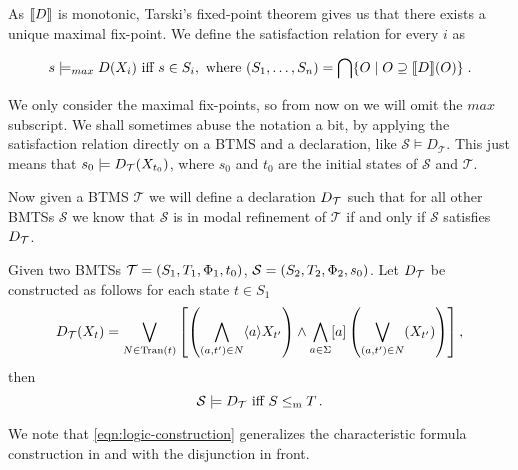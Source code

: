 As $\llbracket D \rrbracket$ is monotonic, Tarski's fixed-point theorem gives us that there exists a unique maximal fix-point. 
We define the satisfaction relation for every $i$ as

\[
	s \models_{max} D(X_i) \text{ iff } s \in S_i, \text{ where } (S_1,\ldots,S_n) = \bigcap \{O \mid O \supseteq \llbracket D \rrbracket(O)\}\;.
\]

We only consider the maximal fix-points, so from now on we will omit the $max$ subscript. We shall sometimes abuse the notation a bit, by applying the satisfaction relation directly on a BTMS and a declaration, like $ \mathcal S \models D_\mathcal T$. This just means that $s_0 \models D_\mathcal{T}(X_{t_0})$, where $s_0$ and $t_0$ are the initial states of $\mathcal S$ and $\mathcal T$.

Now given a BTMS $\mathcal{T}$ we will define a declaration $D_\mathcal{T}$ such that for all other BMTSs $\mathcal{S}$ we know that $\mathcal{S}$ is in modal refinement of $\mathcal{T}$ if and only if $\mathcal{S}$ satisfies $D_\mathcal{T}$.

\begin{theorem}\label{thm:charataristic}
	Given two BMTSs $\mathcal{T}=(S_1,T_1,\mathrm{\Phi}_1,t_0)$, $\mathcal{S} = (S_2,T_2,\mathrm{\Phi}_2,s_0)$. Let $D_\mathcal{T}$ be constructed as follows for each state $t \in S_1$ 
	\[\label{eqn:logic-construction}
		\DecT(X_t) = 	%
				 	\bigvee_{ N \in \val(t)}
					\left [ 
						\left ( 
							\bigwedge_{(a,t') \in N}\ldia{a}X_{t'}
						\right ) 
						\wedge 
						\bigwedge_{a \in \Sigma}\lbox{a}
							\left( 
								\bigvee_{(a,t') \in N}(X_{t'}) 
							\right)
					\right ],
	\]
	then 
	\[
		\mathcal{S} \models D_\mathcal{T} \text{ iff } S \le_\mathrm m T\,.
	\]
\end{theorem}
We note that \eqref{eqn:logic-construction} generalizes the characteristic formula construction in \cite{DBLP:journals/iandc/SteffenI94} and \linebreak \cite{AILS:reactive:07} with the disjunction in front. 

